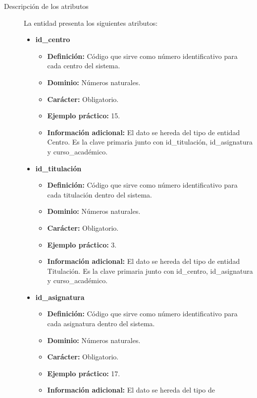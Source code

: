 \begin{description}
   \item[Descripción de los atributos] La entidad presenta los siguientes
   atributos:

   \begin{itemize}
   \item \textbf{id\_centro}
      \begin{itemize}
         \item \textbf{Definición:} Código que sirve como número identificativo
               para cada centro del sistema.
         \item \textbf{Dominio:} Números naturales.
         \item \textbf{Carácter:} Obligatorio.
         \item \textbf{Ejemplo práctico:} 15.
         \item \textbf{Información adicional:} El dato se hereda del tipo de
         entidad Centro. Es la clave primaria junto con id\_titulación,
         id\_asignatura y curso\_académico.
      \end{itemize}
   \item \textbf{id\_titulación}
      \begin{itemize}
         \item \textbf{Definición:} Código que sirve como número identificativo
         para cada titulación dentro del sistema.
         \item \textbf{Dominio:} Números naturales.
         \item \textbf{Carácter:} Obligatorio.
         \item \textbf{Ejemplo práctico:} 3.
         \item \textbf{Información adicional:} El dato se hereda del tipo de
         entidad Titulación. Es la clave primaria junto con id\_centro,
         id\_asignatura y curso\_académico.
      \end{itemize}
   \item \textbf{id\_asignatura}
      \begin{itemize}
         \item \textbf{Definición:} Código que sirve como número identificativo
         para cada asignatura dentro del sistema.
         \item \textbf{Dominio:} Números naturales.
         \item \textbf{Carácter:} Obligatorio.
         \item \textbf{Ejemplo práctico:} 17.
         \item \textbf{Información adicional:} El dato se hereda del tipo de

\end{itemize}
\end{itemize}
\end{description}
